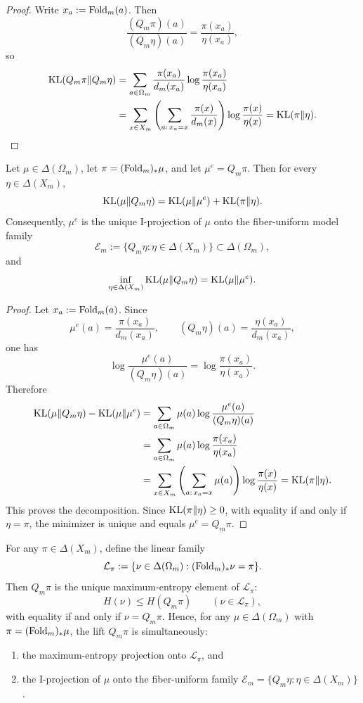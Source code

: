 \begin{proof}
Write \(x_a:=\mathrm{Fold}_m(a)\). Then
\[
\frac{(Q_m\pi)(a)}{(Q_m\eta)(a)}
=
\frac{\pi(x_a)}{\eta(x_a)},
\]
so
\[
\begin{aligned}
\operatorname{KL}(Q_m\pi\|Q_m\eta)
&=
\sum_{a\in\Omega_m}\frac{\pi(x_a)}{d_m(x_a)}
\log\frac{\pi(x_a)}{\eta(x_a)}\\
&=
\sum_{x\in X_m}
\left(\sum_{a:\,x_a=x}\frac{\pi(x)}{d_m(x)}\right)
\log\frac{\pi(x)}{\eta(x)}
=
\operatorname{KL}(\pi\|\eta).
\end{aligned}
\]
\end{proof}

\begin{theorem}\label{thm:fold-kl-pythagoras}
Let \(\mu\in\Delta(\Omega_m)\), let \(\pi=(\mathrm{Fold}_m)_*\mu\), and let
\(\mu^e=Q_m\pi\). Then for every \(\eta\in\Delta(X_m)\),
\[
\operatorname{KL}(\mu\|Q_m\eta)
=
\operatorname{KL}(\mu\|\mu^e)+\operatorname{KL}(\pi\|\eta).
\]
Consequently, \(\mu^e\) is the unique I-projection of \(\mu\) onto the
fiber-uniform model family
\[
\mathcal E_m:=\{Q_m\eta:\eta\in\Delta(X_m)\}\subset\Delta(\Omega_m),
\]
and
\[
\inf_{\eta\in\Delta(X_m)}\operatorname{KL}(\mu\|Q_m\eta)=\operatorname{KL}(\mu\|\mu^e).
\]
\end{theorem}

\begin{proof}
Let \(x_a:=\mathrm{Fold}_m(a)\). Since
\[
\mu^e(a)=\frac{\pi(x_a)}{d_m(x_a)},
\qquad
(Q_m\eta)(a)=\frac{\eta(x_a)}{d_m(x_a)},
\]
one has
\[
\log\frac{\mu^e(a)}{(Q_m\eta)(a)}=\log\frac{\pi(x_a)}{\eta(x_a)}.
\]
Therefore
\[
\begin{aligned}
\operatorname{KL}(\mu\|Q_m\eta)-\operatorname{KL}(\mu\|\mu^e)
&=
\sum_{a\in\Omega_m}\mu(a)\log\frac{\mu^e(a)}{(Q_m\eta)(a)}\\
&=
\sum_{a\in\Omega_m}\mu(a)\log\frac{\pi(x_a)}{\eta(x_a)}\\
&=
\sum_{x\in X_m}
\left(\sum_{a:\,x_a=x}\mu(a)\right)\log\frac{\pi(x)}{\eta(x)}
=
\operatorname{KL}(\pi\|\eta).
\end{aligned}
\]
This proves the decomposition. Since \(\operatorname{KL}(\pi\|\eta)\ge 0\), with equality if
and only if \(\eta=\pi\), the minimizer is unique and equals \(\mu^e=Q_m\pi\).
\end{proof}

\begin{proposition}
\label{prop:dual-projection-maxent}
For any \(\pi\in\Delta(X_m)\), define the linear family
\[
\mathcal L_\pi:=\{\nu\in\Delta(\Omega_m):(\mathrm{Fold}_m)_*\nu=\pi\}.
\]
Then \(Q_m\pi\) is the unique maximum-entropy element of
\(\mathcal L_\pi\):
\[
H(\nu)\le H(Q_m\pi)
\qquad(\nu\in\mathcal L_\pi),
\]
with equality if and only if \(\nu=Q_m\pi\). Hence, for any
\(\mu\in\Delta(\Omega_m)\) with \(\pi=(\mathrm{Fold}_m)_*\mu\), the lift
\(Q_m\pi\) is simultaneously:
\begin{enumerate}
\item the maximum-entropy projection onto \(\mathcal L_\pi\), and
\item the I-projection of \(\mu\) onto the fiber-uniform family
  \(\mathcal E_m=\{Q_m\eta:\eta\in\Delta(X_m)\}\).
\end{enumerate}
\end{proposition}

